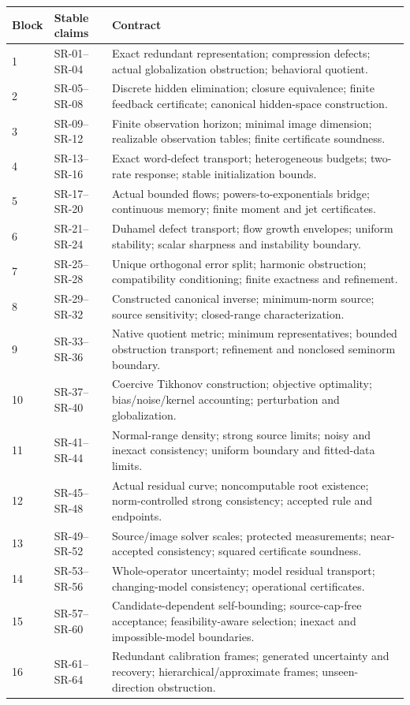 \documentclass[11pt]{article}
\theoremstyle{definition}\newtheorem{definition}[theorem]{Definition}
\theoremstyle{remark}\newtheorem{remark}[theorem]{Remark}
\begin{document}
\small
\begin{longtable}{@{}p{}p{}p{}@{}}
\toprule Block & Stable claims & Contract\\\midrule\endhead
1 & SR-01--SR-04 & Exact redundant representation; compression defects; actual globalization obstruction; behavioral quotient.\\
2 & SR-05--SR-08 & Discrete hidden elimination; closure equivalence; finite feedback certificate; canonical hidden-space construction.\\
3 & SR-09--SR-12 & Finite observation horizon; minimal image dimension; realizable observation tables; finite certificate soundness.\\
4 & SR-13--SR-16 & Exact word-defect transport; heterogeneous budgets; two-rate response; stable initialization bounds.\\
5 & SR-17--SR-20 & Actual bounded flows; powers-to-exponentials bridge; continuous memory; finite moment and jet certificates.\\
6 & SR-21--SR-24 & Duhamel defect transport; flow growth envelopes; uniform stability; scalar sharpness and instability boundary.\\
7 & SR-25--SR-28 & Unique orthogonal error split; harmonic obstruction; compatibility conditioning; finite exactness and refinement.\\
8 & SR-29--SR-32 & Constructed canonical inverse; minimum-norm source; source sensitivity; closed-range characterization.\\
9 & SR-33--SR-36 & Native quotient metric; minimum representatives; bounded obstruction transport; refinement and nonclosed seminorm boundary.\\
10 & SR-37--SR-40 & Coercive Tikhonov construction; objective optimality; bias/noise/kernel accounting; perturbation and globalization.\\
11 & SR-41--SR-44 & Normal-range density; strong source limits; noisy and inexact consistency; uniform boundary and fitted-data limits.\\
12 & SR-45--SR-48 & Actual residual curve; noncomputable root existence; norm-controlled strong consistency; accepted rule and endpoints.\\
13 & SR-49--SR-52 & Source/image solver scales; protected measurements; near-accepted consistency; squared certificate soundness.\\
14 & SR-53--SR-56 & Whole-operator uncertainty; model residual transport; changing-model consistency; operational certificates.\\
15 & SR-57--SR-60 & Candidate-dependent self-bounding; source-cap-free acceptance; feasibility-aware selection; inexact and impossible-model boundaries.\\
16 & SR-61--SR-64 & Redundant calibration frames; generated uncertainty and recovery; hierarchical/approximate frames; unseen-direction obstruction.\\
\bottomrule\end{longtable}\normalsize
\end{document}
